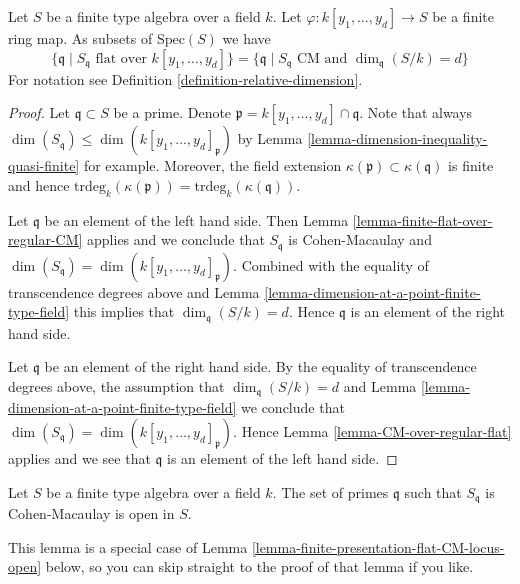 \begin{lemma}
\label{lemma-where-CM}
Let $S$ be a finite type algebra over a field $k$.
Let $\varphi : k[y_1, \ldots, y_d] \to S$ be a finite ring map.
As subsets of $\text{Spec}(S)$ we have
$$
\{ \mathfrak q \mid
S_{\mathfrak q} \text{ flat over }k[y_1, \ldots, y_d]\}
=
\{ \mathfrak q \mid
S_{\mathfrak q} \text{ CM and }\dim_{\mathfrak q}(S/k) = d\}
$$
For notation see Definition \ref{definition-relative-dimension}.
\end{lemma}

\begin{proof}
Let $\mathfrak q \subset S$ be a prime. Denote
$\mathfrak p = k[y_1, \ldots, y_d] \cap \mathfrak q$.
Note that always
$\dim(S_{\mathfrak q}) \leq \dim(k[y_1, \ldots, y_d]_{\mathfrak p})$
by Lemma \ref{lemma-dimension-inequality-quasi-finite} for example.
Moreover, the field extension $\kappa(\mathfrak p) \subset \kappa(\mathfrak q)$
is finite and hence
$\text{trdeg}_k(\kappa(\mathfrak p)) = \text{trdeg}_k(\kappa(\mathfrak q))$.

\medskip\noindent
Let $\mathfrak q$ be an element of the left hand side.
Then Lemma \ref{lemma-finite-flat-over-regular-CM} applies
and we conclude that $S_{\mathfrak q}$ is Cohen-Macaulay
and $\dim(S_{\mathfrak q}) = \dim(k[y_1, \ldots, y_d]_{\mathfrak p})$.
Combined with the equality of transcendence degrees above and
Lemma \ref{lemma-dimension-at-a-point-finite-type-field} this
implies that $\dim_{\mathfrak q}(S/k) = d$. Hence $\mathfrak q$
is an element of the right hand side.

\medskip\noindent
Let $\mathfrak q$ be an element of the right hand side.
By the equality of transcendence degrees above, the assumption
that $\dim_{\mathfrak q}(S/k) = d$ and
Lemma \ref{lemma-dimension-at-a-point-finite-type-field}
we conclude that
$\dim(S_{\mathfrak q}) = \dim(k[y_1, \ldots, y_d]_{\mathfrak p})$.
Hence Lemma \ref{lemma-CM-over-regular-flat}
applies and we see that $\mathfrak q$ is an
element of the left hand side.
\end{proof}

\begin{lemma}
\label{lemma-finite-type-over-field-CM-open}
Let $S$ be a finite type algebra over a field $k$.
The set of primes $\mathfrak q$ such that $S_{\mathfrak q}$ is
Cohen-Macaulay is open in $S$.
\end{lemma}

\noindent
This lemma is a special case of
Lemma \ref{lemma-finite-presentation-flat-CM-locus-open} below,
so you can skip straight to the proof of that lemma if you like.

